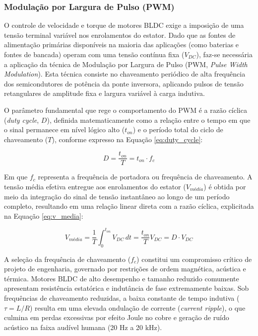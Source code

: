 \subsubsection{Modulação por Largura de Pulso (PWM)} 

O controle de velocidade e torque de motores BLDC exige a imposição de uma tensão terminal variável nos enrolamentos do estator. Dado que as fontes de alimentação primárias disponíveis na maioria das aplicações (como baterias e fontes de bancada) operam com uma tensão contínua fixa ($V_{DC}$), faz-se necessária a aplicação da técnica de Modulação por Largura de Pulso (PWM, \textit{Pulse Width Modulation}). Esta técnica consiste no chaveamento periódico de alta frequência dos semicondutores de potência da ponte inversora, aplicando pulsos de tensão retangulares de amplitude fixa e largura variável à carga indutiva.

O parâmetro fundamental que rege o comportamento do PWM é a razão cíclica (\textit{duty cycle}, $D$), definida matematicamente como a relação entre o tempo em que o sinal permanece em nível lógico alto ($t_{on}$) e o período total do ciclo de chaveamento ($T$), conforme expresso na Equação \ref{eq:duty_cycle}:

\begin{equation}
D = \frac{t_{on}}{T} = t_{on} \cdot f_c
\label{eq:duty_cycle}
\end{equation}

Em que $f_c$ representa a frequência de portadora ou frequência de chaveamento. A tensão média efetiva entregue aos enrolamentos do estator ($V_{m\text{é}dia}$) é obtida por meio da integração do sinal de tensão instantâneo ao longo de um período completo, resultando em uma relação linear direta com a razão cíclica, explicitada na Equação \ref{eq:v_media}:

\begin{equation}
V_{m\text{é}dia} = \frac{1}{T} \int_{0}^{t_{on}} V_{DC} \, dt = \frac{t_{on}}{T} V_{DC} = D \cdot V_{DC}
\label{eq:v_media}
\end{equation}

A seleção da frequência de chaveamento ($f_c$) constitui um compromisso crítico de projeto de engenharia, governado por restrições de ordem magnética, acústica e térmica. Motores BLDC de alto desempenho e tamanho reduzido comumente apresentam resistência estatórica e indutância de fase extremamente baixas. Sob frequências de chaveamento reduzidas, a baixa constante de tempo indutiva ($\tau = L/R$) resulta em uma elevada ondulação de corrente (\textit{current ripple}), o que culmina em perdas excessivas por efeito Joule no cobre e geração de ruído acústico na faixa audível humana (20 Hz a 20 kHz). 

